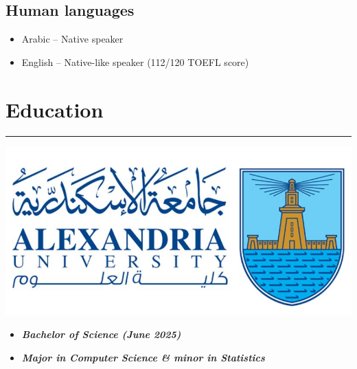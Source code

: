 \documentclass[10pt]{article}
\newcommand{\fancy}[1]{\Large\textbf{\textit{#1}}}
\begin{document}
\subsection*{\Large{Human languages}}
\begin{itemize}
	\item Arabic -- Native speaker
	\item English -- Native-like speaker (112/120 TOEFL score)
\end{itemize}




\section*{Education}
\hrule
\noindent

\begin{minipage}{0.3\textwidth}
	\vspace{1em}
	\begin{center}
		\includegraphics[width=\textwidth]{FOS_logo.jpg}
\end{center}
\end{minipage}
\begin{minipage}{0.7\textwidth}
\vspace{2em}
\begin{center}
    \begin{itemize}
        \item \large \fancy{Bachelor of Science (June 2025)}
    \end{itemize}
    \begin{itemize}
        \item \large \fancy{Major in Computer Science \& minor in Statistics}
    \end{itemize}
\end{center}
\end{minipage}
\end{document}
